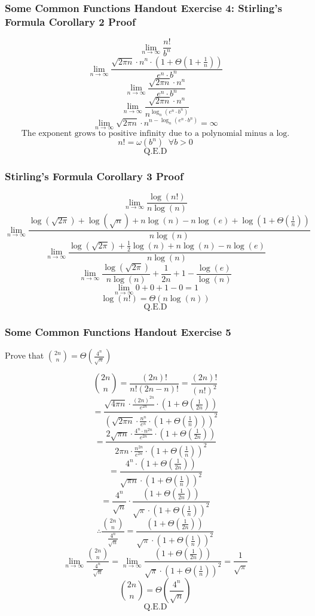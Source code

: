 \documentclass{article}
\begin{document}
\subsubsection{Some Common Functions Handout Exercise 4: Stirling's Formula Corollary 2 Proof}
$$\lim_{n \rightarrow \infty} \frac{n!}{b^n}$$
$$\lim_{n \rightarrow \infty} \frac{\sqrt{2\pi n} \cdot n^n \cdot (1 + \Theta(1 + \frac{1}{n}))}{e^n \cdot b^n}$$
$$\lim_{n \rightarrow \infty} \frac{\sqrt{2\pi n} \cdot n^n}{e^n \cdot b^n}$$
$$\lim_{n \rightarrow \infty} \frac{\sqrt{2\pi n} \cdot n^n}{n^{\log_{n}(e^n \cdot b^n)}}$$
$$\lim_{n \rightarrow \infty} \sqrt{2\pi n} \cdot n^{n - \log_{n}(e^n \cdot b^n)} = \infty$$
$$\text{The exponent grows to positive infinity due to a polynomial minus a log.}$$
$$n! = \omega(b^n) \;\; \forall b > 0$$
$$\text{Q.E.D}$$

\subsubsection{Stirling's Formula Corollary 3 Proof}
$$\lim_{n \rightarrow \infty} \frac{\log(n!)}{n\log(n)}$$
$$\lim_{n \rightarrow \infty} \frac{\log(\sqrt{2\pi}) + \log(\sqrt{n}) + n\log(n) - n\log(e) + \log(1 + \Theta(\frac{1}{n}))}{n\log(n)}$$
$$\lim_{n \rightarrow \infty} \frac{\log(\sqrt{2\pi}) + \frac{1}{2}\log(n) + n\log(n) - n\log(e) }{n\log(n)}$$
$$\lim_{n \rightarrow \infty} \frac{\log(\sqrt{2\pi})}{n\log(n)} + \frac{1}{2n} + 1 - \frac{\log(e)}{\log(n)}$$
$$\lim_{n \rightarrow \infty} 0 + 0 + 1 - 0 = 1$$
$$\log(n!) = \Theta(n\log(n))$$
$$\text{Q.E.D}$$

\subsubsection{Some Common Functions Handout Exercise 5}
Prove that $\binom{2n}{n} = \Theta(\frac{4^n}{\sqrt{n}})$ 

$$\binom{2n}{n} = \frac{(2n)!}{n!(2n-n)!} = \frac{(2n)!}{(n!)^2}$$
$$= \frac{\sqrt{4\pi n} \cdot \frac{(2n)^{2n}}{e^{2n}} \cdot (1 + \Theta(\frac{1}{2n}))}{(\sqrt{2\pi n} \cdot \frac{n^n}{e^n} \cdot (1 + \Theta(\frac{1}{n})))^2}$$
$$= \frac{2\sqrt{\pi n} \cdot \frac{4^n \cdot n^{2n}}{e^{2n}} \cdot (1 + \Theta(\frac{1}{2n}))}{2\pi n \cdot \frac{n^{2n}}{e^{2n}} \cdot (1 + \Theta(\frac{1}{n}))^2}$$
$$= \frac{4^n \cdot (1 + \Theta(\frac{1}{2n}))}{\sqrt{\pi n} \cdot (1 + \Theta(\frac{1}{n}))^2}$$
$$=\frac{4^n}{\sqrt{n}} \cdot \frac{(1 + \Theta(\frac{1}{2n}))}{\sqrt{\pi}\cdot (1 + \Theta(\frac{1}{n}))^2}$$
$$\therefore \frac{\binom{2n}{n}}{\frac{4^n}{\sqrt{n}}} = \frac{(1 + \Theta(\frac{1}{2n}))}{\sqrt{\pi} \cdot (1 + \Theta(\frac{1}{n}))^2}$$
$$\lim_{n \rightarrow \infty} \frac{\binom{2n}{n}}{\frac{4^n}{\sqrt{n}}} = \lim_{n \rightarrow \infty} \frac{(1 + \Theta(\frac{1}{2n}))}{\sqrt{\pi} \cdot (1 + \Theta(\frac{1}{n}))^2} = \frac{1}{\sqrt{\pi}}$$
$$\binom{2n}{n} = \Theta(\frac{4^n}{\sqrt{n}})$$
$$\text{Q.E.D}$$
\end{document}
